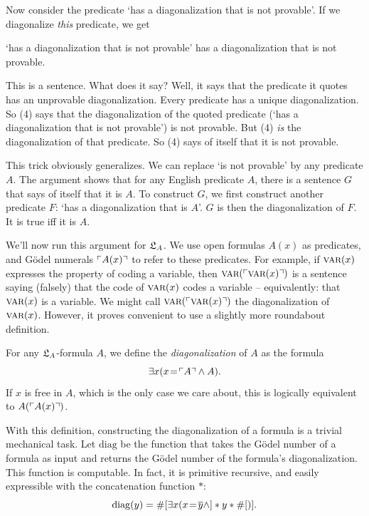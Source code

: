 Now consider the predicate `has a diagonalization that is not provable'.
If we diagonalize \emph{this} predicate,
we get
\begin{cenumerate}
  \item[(4)] `has a diagonalization that is not provable' has a diagonalization that is not provable.
\end{cenumerate}
This is a sentence.
What does it say?
Well,
it says that the predicate it quotes has an unprovable diagonalization.
Every predicate has a unique diagonalization.
So (4) says that the diagonalization of the quoted predicate (`has a diagonalization that is not provable') is not provable.
But (4) \textit{is} the diagonalization of that predicate.
So (4) says of itself that it is not provable.

This trick obviously generalizes.
We can replace `is not provable' by any predicate $A$.
The argument shows that
for any English predicate $A$,
there is a sentence $G$ that says of itself that it is $A$.
To construct $G$,
we first construct another predicate $F$: `has a diagonalization that is $A$'.
$G$ is then the diagonalization of $F$.
It is true iff it is $A$.

We'll now run this argument for $\mathfrak{L}_A$.
We use open formulas $A(x)$ as predicates,
and Gödel numerals $\ulcorner A(x) \urcorner$ to refer to these predicates.
For example,
if $\smallcaps{Var}(x)$ expresses the property of coding a variable,
then $\smallcaps{Var}(\gn{\smallcaps{Var}(x)})$ is a sentence
saying (falsely) that the code of $\smallcaps{Var}(x)$ codes a variable
-- equivalently: that $\smallcaps{Var}(x)$ is a variable.
We might call $\smallcaps{Var}(\gn{\smallcaps{Var}(x)})$
the diagonalization of $\smallcaps{Var}(x)$.
However,
it proves convenient to use a slightly more roundabout definition.

For any $\mathfrak{L}_A$-formula $A$,
we define the \emph{diagonalization} of $A$ as the formula
\[
  \exists x(x\!=\!\ulcorner A \urcorner \land A).
\]
\noindent%
If $x$ is free in $A$,
which is the only case we care about,
this is logically equivalent to $A(\ulcorner A(x) \urcorner)$.

With this definition,
constructing the diagonalization of a formula is a trivial mechanical task.
Let $\mathrm{diag}$ be the function that
takes the Gödel number of a formula as input
and returns the Gödel number of the formula's diagonalization.
This function is computable.
In fact,
it is primitive recursive,
and easily expressible with the concatenation function $*$:
\[
  \mathrm{diag}(y) = \#[\exists x(x\!=\!\overline{y} \land] * y * \#[)].
\]

